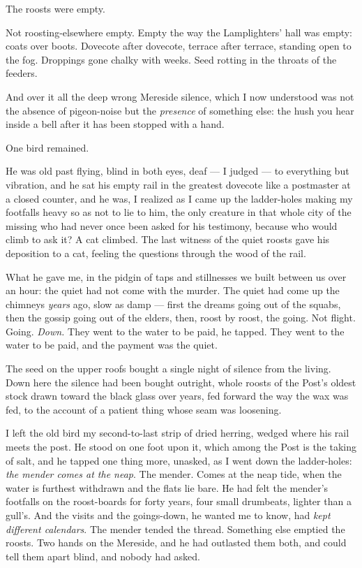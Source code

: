 The roosts were empty.

Not roosting-elsewhere empty. Empty the way the Lamplighters' hall was empty: coats over boots. Dovecote after dovecote, terrace after terrace, standing open to the fog. Droppings gone chalky with weeks. Seed rotting in the throats of the feeders.

And over it all the deep wrong Mereside silence, which I now understood was not the absence of pigeon-noise but the \emph{presence} of something else: the hush you hear inside a bell after it has been stopped with a hand.

One bird remained.

He was old past flying, blind in both eyes, deaf --- I judged --- to everything but vibration, and he sat his empty rail in the greatest dovecote like a postmaster at a closed counter, and he was, I realized as I came up the ladder-holes making my footfalls heavy so as not to lie to him, the only creature in that whole city of the missing who had never once been asked for his testimony, because who would climb to ask it? A cat climbed. The last witness of the quiet roosts gave his deposition to a cat, feeling the questions through the wood of the rail.

What he gave me, in the pidgin of taps and stillnesses we built between us over an hour: the quiet had not come with the murder. The quiet had come up the chimneys \emph{years} ago, slow as damp --- first the dreams going out of the squabs, then the gossip going out of the elders, then, roost by roost, the going. Not flight. Going. \emph{Down.} They went to the water to be paid, he tapped. They went to the water to be paid, and the payment was the quiet.

The seed on the upper roofs bought a single night of silence from the living. Down here the silence had been bought outright, whole roosts of the Post's oldest stock drawn toward the black glass over years, fed forward the way the wax was fed, to the account of a patient thing whose seam was loosening.

I left the old bird my second-to-last strip of dried herring, wedged where his rail meets the post. He stood on one foot upon it, which among the Post is the taking of salt, and he tapped one thing more, unasked, as I went down the ladder-holes: \emph{the mender comes at the neap}. The mender. Comes at the neap tide, when the water is furthest withdrawn and the flats lie bare. He had felt the mender's footfalls on the roost-boards for forty years, four small drumbeats, lighter than a gull's. And the visits and the goings-down, he wanted me to know, had \emph{kept different calendars}. The mender tended the thread. Something else emptied the roosts. Two hands on the Mereside, and he had outlasted them both, and could tell them apart blind, and nobody had asked.

